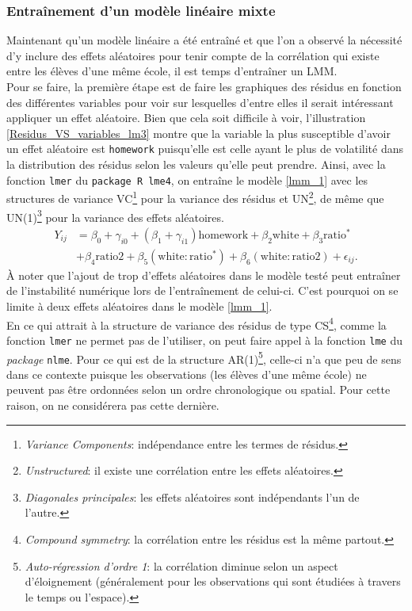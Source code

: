 \documentclass{article}
\begin{document}
	\subsubsection*{Entraînement d'un modèle linéaire mixte}
		Maintenant qu'un modèle linéaire a été entraîné et que l'on a observé la nécessité d'y inclure des effets aléatoires pour tenir compte de la corrélation qui existe entre les élèves d'une même école, il est temps d'entraîner un LMM.\\
		
		Pour se faire, la première étape est de faire les graphiques des résidus en fonction des différentes variables pour voir sur lesquelles d'entre elles il serait intéressant appliquer un effet aléatoire. Bien que cela soit difficile à voir, l'illustration \ref{Residus_VS_variables_lm3} montre que la variable la plus susceptible d'avoir un effet aléatoire est \texttt{homework} puisqu'elle est celle ayant le plus de volatilité dans la distribution des résidus selon les valeurs qu'elle peut prendre. Ainsi, avec la fonction \texttt{lmer} du \texttt{package R lme4}, on entraîne le modèle \eqref{lmm_1} avec les structures de variance VC\footnote{\textit{Variance Components}: indépendance entre les termes de résidus.} pour la variance des résidus et UN\footnote{\textit{Unstructured}: il existe une corrélation entre les effets aléatoires.}, de même que UN(1)\footnote{\textit{Diagonales principales}: les effets aléatoires sont indépendants l'un de l'autre.} pour la variance des effets aléatoires.
		\begin{align}\label{lmm_1}
			Y_{ij} &= \beta_0+\gamma_{i0} + (\beta_1 + \gamma_{i1}) \mathrm{homework} + \beta_2 \mathrm{white} + \beta_3 \mathrm{ratio^*} \\
			&+ \beta_4 \mathrm{ratio2} + \beta_5( \mathrm{white:ratio^*}) + \beta_6 (\mathrm{white:ratio2}) + \epsilon_{ij}. \nonumber
		\end{align}
		À noter que l'ajout de trop d'effets aléatoires dans le modèle testé peut entraîner de l'instabilité numérique lors de l'entraînement de celui-ci. C'est pourquoi on se limite à deux effets aléatoires dans le modèle \eqref{lmm_1}.\\
		
		En ce qui attrait à la structure de variance des résidus de type CS\footnote{\textit{Compound symmetry}: la corrélation entre les résidus est la même partout.}, comme la fonction \texttt{lmer} ne permet pas de l'utiliser, on peut faire appel à la fonction \texttt{lme} du \textit{package} \texttt{nlme}.
		Pour ce qui est de la structure AR(1)\footnote{\textit{Auto-régression d'ordre 1}: la corrélation diminue selon un aspect d'éloignement (généralement pour les observations qui sont étudiées à travers le temps ou l'espace).}, celle-ci n'a que peu de sens dans ce contexte puisque les observations (les élèves d'une même école) ne peuvent pas être ordonnées selon un ordre chronologique ou spatial. Pour cette raison, on ne considérera pas cette dernière.\\
\end{document}
